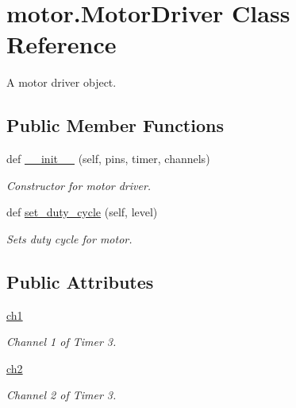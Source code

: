 \hypertarget{classmotor_1_1_motor_driver}{}\section{motor.\+Motor\+Driver Class Reference}
\label{classmotor_1_1_motor_driver}


A motor driver object.  


\subsection*{Public Member Functions}
\begin{DoxyCompactItemize}
\item 
def \mbox{\hyperlink{classmotor_1_1_motor_driver_a21feb0e2236f52901780b84a989008d1}{\+\_\+\+\_\+init\+\_\+\+\_\+}} (self, pins, timer, channels)
\begin{DoxyCompactList}\small\item\em Constructor for motor driver. \end{DoxyCompactList}\item 
def \mbox{\hyperlink{classmotor_1_1_motor_driver_a51b4721406aa66e0807413199b8b700f}{set\+\_\+duty\+\_\+cycle}} (self, level)
\begin{DoxyCompactList}\small\item\em Sets duty cycle for motor. \end{DoxyCompactList}\end{DoxyCompactItemize}
\subsection*{Public Attributes}
\begin{DoxyCompactItemize}
\item 
\mbox{\label{classmotor_1_1_motor_driver_ab59ff180f9593d716a60d0177cd8564e}} 
\mbox{\hyperlink{classmotor_1_1_motor_driver_ab59ff180f9593d716a60d0177cd8564e}{ch1}}
\begin{DoxyCompactList}\small\item\em Channel 1 of Timer 3. \end{DoxyCompactList}\item 
\mbox{\label{classmotor_1_1_motor_driver_af47581f527f4163d62810c617e081001}} 
\mbox{\hyperlink{classmotor_1_1_motor_driver_af47581f527f4163d62810c617e081001}{ch2}}
\begin{DoxyCompactList}\small\item\em Channel 2 of Timer 3. \end{DoxyCompactList}\end{DoxyCompactItemize}


